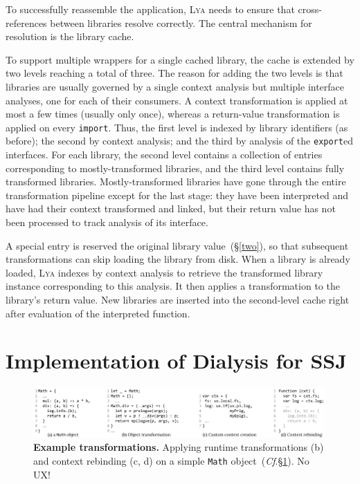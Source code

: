 \documentclass[letterpaper,twocolumn,10pt]{article}
\newcommand{\ttt}[1]{\texttt{#1}}
\newcommand{\cf}[1]{(\emph{Cf}.\S\ref{#1})}
\newcommand{\sx}[1]{(\S\ref{#1})}
\newcommand{\sys}{{\scshape Lya}\xspace}
\newcommand{\fixme}[1]{{\color{red}#1}}
\begin{document}
To successfully reassemble the application, \sys needs to ensure that cross-references between libraries resolve correctly.
The central mechanism for resolution is the library cache.

To support multiple wrappers for a single cached library, the cache is extended by two levels reaching a total of three.
The reason for adding the two levels is that libraries are usually governed by a single context analysis but multiple interface analyses, one for each of their consumers.
A context transformation is applied at most a few times (usually only once), whereas a return-value transformation is applied on every \ttt{import}.
Thus, the first level is indexed by library identifiers (as before); the second by context analysis; and the third by analysis of the \ttt{export}ed interfaces.
For each library, the second level contains a collection of entries corresponding to mostly-transformed libraries, and the third level contains fully transformed libraries.
Mostly-transformed libraries have gone through the entire transformation pipeline except for the last stage:
  they have been interpreted and have had their context transformed and linked, but their return value has not been processed to track analysis of its interface.

A special entry is reserved the original library value~\sx{two}, so that subsequent transformations can skip loading the library from disk.
When a library is already loaded, \sys indexes by context analysis to retrieve the transformed library instance corresponding to this analysis.
It then applies a transformation to the library's return value.
New libraries are inserted into the second-level cache right after evaluation of the interpreted function.


\section{Implementation of Dialysis for SSJ}
\label{impl}

\begin{figure}[t]
\centering
\includegraphics[width=0.99\textwidth]{./figs/lya_ex.pdf}
\vspace{-2mm}
\caption{
  \textbf{Example transformations.}
   Applying runtime transformations (b) and context rebinding (c, d) on a simple \ttt{Math} object~\cf{impl}.
\fixme{No UX!}
}
\label{fig:tx2}
\vspace{-2mm}
\end{figure}
\end{document}
